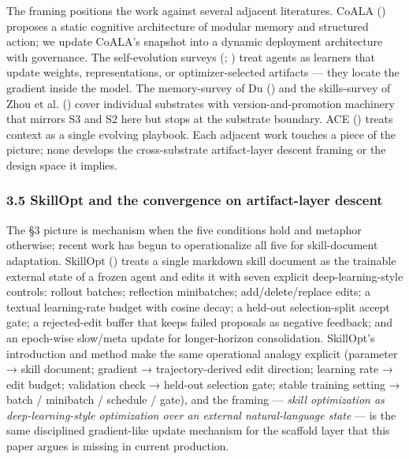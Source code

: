 \documentclass[
]{article}
\newcounter{none} %
\begin{document}
The framing positions the work against several adjacent literatures.
CoALA () proposes a
static cognitive architecture of modular memory and structured action;
we update CoALA's snapshot into a dynamic deployment architecture with
governance. The self-evolution surveys
(;
) treat agents
as learners that update weights, representations, or optimizer-selected
artifacts --- they locate the gradient inside the model. The
memory-survey of Du () and the
skills-survey of {Zhou et al.} ()
cover individual substrates with version-and-promotion machinery that
mirrors S3 and S2 here but stops at the substrate boundary. ACE
() treats context
as a single evolving playbook. Each adjacent work touches a piece of the
picture; none develops the cross-substrate artifact-layer descent
framing or the design space it implies.

\subsubsection{3.5 SkillOpt and the convergence on artifact-layer
descent}\label{skillopt-and-the-convergence-on-artifact-layer-descent}

The §3 picture is mechanism when the five conditions hold and metaphor
otherwise; recent work has begun to operationalize all five for
skill-document adaptation. SkillOpt
() treats a single
markdown skill document as the trainable external state of a frozen
agent and edits it with seven explicit deep-learning-style controls:
rollout batches; reflection minibatches; add/delete/replace edits; a
textual learning-rate budget with cosine decay; a held-out
selection-split accept gate; a rejected-edit buffer that keeps failed
proposals as negative feedback; and an epoch-wise slow/meta update for
longer-horizon consolidation. SkillOpt's introduction and method make
the same operational analogy explicit (parameter → skill document;
gradient → trajectory-derived edit direction; learning rate → edit
budget; validation check → held-out selection gate; stable training
setting → batch / minibatch / schedule / gate), and the framing ---
\emph{skill optimization as deep-learning-style optimization over an
external natural-language state} --- is the same disciplined
gradient-like update mechanism for the scaffold layer that this paper
argues is missing in current production.
\end{document}
